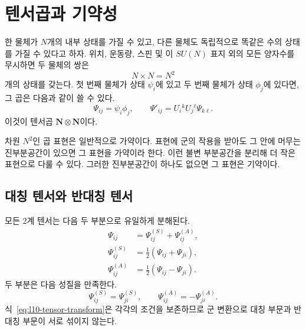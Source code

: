\section{텐서곱과 기약성}

한 물체가 \(N\)개의 내부 상태를 가질 수 있고, 다른 물체도 독립적으로 똑같은 수의 상태를 가질 수 있다고 하자. 위치, 운동량, 스핀 및 이 \(SU(N)\) 표지 외의 모든 양자수를 무시하면 두 물체의 쌍은
\begin{equation}
N\times N=N^2
\label{eq:l10-product-count}
\end{equation}
개의 상태를 갖는다. 첫 번째 물체가 상태 \(\psi_i\)에 있고 두 번째 물체가 상태 \(\phi_j\)에 있다면, 그 곱은 다음과 같이 쓸 수 있다.
\begin{equation}
\Psi_{ij}=\psi_i\phi_j,
\qquad
\Psi'_{ij}=U_i{}^kU_j{}^\ell\Psi_{k\ell}.
\label{eq:l10-tensor-transform}
\end{equation}
이것이 텐서곱 \(\mathbf N\otimes\mathbf N\)이다.

\begin{classroomqa}
\end{classroomqa}

차원 \(N^2\)인 곱 표현은 일반적으로 가약이다. 표현에 군의 작용을 받아도 그 안에 머무는 진부분공간이 있으면 그 표현을 가약이라 한다. 이런 불변 부분공간을 분리해 더 작은 표현으로 다룰 수 있다. 그러한 진부분공간이 하나도 없으면 그 표현은 기약이다.

\subsection{대칭 텐서와 반대칭 텐서}

모든 2계 텐서는 다음 두 부분으로 유일하게 분해된다.
\begin{align}
\Psi_{ij}
&=\Psi^{(S)}_{ij}+\Psi^{(A)}_{ij},\\
\Psi^{(S)}_{ij}
&=\frac12(\Psi_{ij}+\Psi_{ji}),\\
\Psi^{(A)}_{ij}
&=\frac12(\Psi_{ij}-\Psi_{ji}).
\label{eq:l10-sym-anti}
\end{align}
두 부분은 다음 성질을 만족한다.
\begin{equation}
\Psi^{(S)}_{ij}=\Psi^{(S)}_{ji},
\qquad
\Psi^{(A)}_{ij}=-\Psi^{(A)}_{ji}.
\end{equation}
식~\eqref{eq:l10-tensor-transform}은 각각의 조건을 보존하므로 군 변환으로 대칭 부문과 반대칭 부문이 서로 섞이지 않는다.

